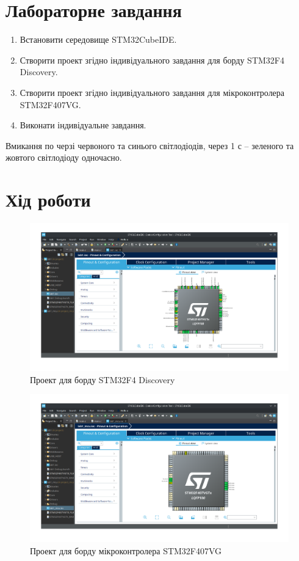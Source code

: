 \documentclass[oneside,14pt]{extarticle}
\begin{document}
\begin{normalsize}
    \section*{Лабораторне завдання}
	\begin{enumerate}
		\item Встановити середовище STM32CubeIDE.
		\item Створити проект згідно індивідуального завдання для борду STM32F4
		Discovery.
		\item Створити проект згідно індивідуального завдання для мікроконтролера
		STM32F407VG.
		\item Виконати індивідуальне завдання.
	\end{enumerate}

Вмикання по черзі червоного та синього світлодіодів, через 1 с – зеленого
та жовтого світлодіоду одночасно.

	\section*{Хід роботи}
	
	\begin{figure}[H]
		\centering
		\includegraphics[scale=0.4]{1}
		\caption{Проект для борду STM32F4 Discovery}
	\end{figure}
	
	\begin{figure}[H]
		\centering
		\includegraphics[scale=0.4]{2}
		\caption{Проект для борду мікроконтролера STM32F407VG}
	\end{figure}
	

\end{normalsize}
\end{document}
